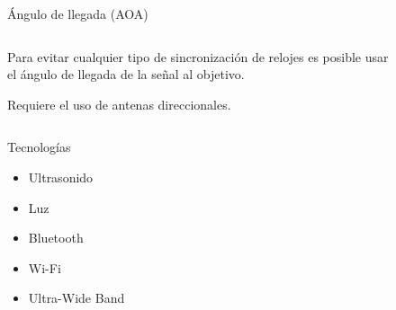 \documentclass{beamer}
\begin{document}
    \begin{frame}{Ángulo de llegada (AOA)}
      \begin{columns}
        \begin{column}{0.5\textwidth}
          Para evitar cualquier tipo de sincronización de relojes es posible usar el ángulo de llegada de la señal al objetivo.

          \vspace{0.5cm}
          Requiere el uso de antenas direccionales.
        \end{column}
        \begin{column}{0.5\textwidth}  
          \begin{figure}[H]
            \centering
            \def\svgwidth{\linewidth}
            
            \label{fig:AOA}
        \end{figure}
        \end{column}
        \end{columns}
      \end{frame}


  \begin{frame}{Tecnologías}
    \begin{itemize}
      \item Ultrasonido
      \item Luz
      \item Bluetooth
      \item Wi-Fi
      \item Ultra-Wide Band
    \end{itemize}
  \end{frame}
\end{document}
